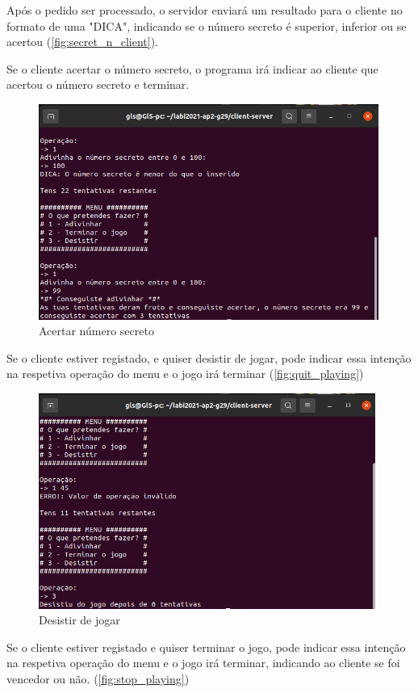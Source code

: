 \documentclass{report}
\begin{document}
Após o pedido ser processado, o servidor enviará um resultado para o cliente no formato de uma "DICA", indicando se o número secreto é superior, inferior ou se acertou (\autoref{fig:secret_n_client}).

Se o cliente acertar o número secreto, o programa irá indicar ao cliente que acertou o número secreto e terminar.

\begin{figure}[!h]
\center 
\includegraphics[height=200pt]{img/fotos_resultado/acertar_num_secret.png}
\caption{Acertar número secreto}
\label{fig:secret_n_acertar}
\end{figure}

Se o cliente estiver registado, e quiser desistir de jogar, pode indicar essa intenção na respetiva operação do menu e o jogo irá terminar (\autoref{fig:quit_playing})

\begin{figure}[!h]
\center 
\includegraphics[height=200pt]{img/fotos_resultado/quit_client.png}
\caption{Desistir de jogar}
\label{fig:quit_playing}
\end{figure}

Se o cliente estiver registado e quiser terminar o jogo, pode indicar essa intenção na respetiva operação do menu e o jogo irá terminar, indicando ao cliente se foi vencedor ou não. (\autoref{fig:stop_playing})
\end{document}
